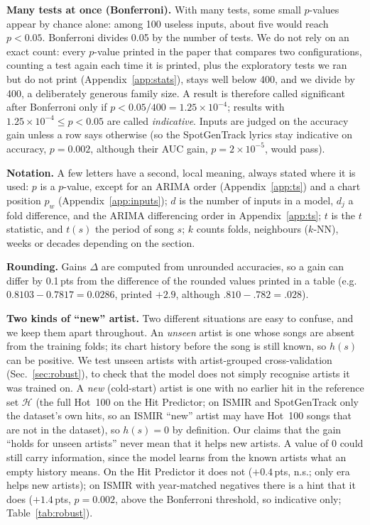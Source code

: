\documentclass[conference]{IEEEtran}
\newcommand{\pp}{\,pts}
\begin{document}
\textbf{Many tests at once (Bonferroni).} With many tests, some small $p$-values appear by chance alone: among 100
useless inputs, about five would reach $p<0.05$. Bonferroni divides 0.05 by the number of tests. We do not rely on
an exact count: every $p$-value printed in the paper that compares two configurations, counting a test again each time it is printed, plus the
exploratory tests we ran but do not print (Appendix~\ref{app:stats}), stays well below 400, and we
divide by 400, a deliberately generous family size. A result is therefore called significant after Bonferroni only if $p<0.05/400=1.25\times10^{-4}$;
results with $1.25\times10^{-4}\leq p<0.05$ are called \emph{indicative}. Inputs are judged on the accuracy
gain unless a row says otherwise (so the SpotGenTrack lyrics stay indicative on accuracy, $p=0.002$, although their
AUC gain, $p=2\times10^{-5}$, would pass).

\textbf{Notation.} A few letters have a second, local meaning, always stated where it is used: $p$ is a
$p$-value, except for an ARIMA order (Appendix~\ref{app:ts}) and a chart position $p_w$ (Appendix~\ref{app:inputs}); $d$
is the number of inputs in a model, $d_j$ a fold difference, and the ARIMA differencing order in Appendix~\ref{app:ts};
$t$ is the $t$ statistic, and $t(s)$ the period of song $s$; $k$ counts folds, neighbours ($k$-NN), weeks or
decades depending on the section.

\textbf{Rounding.} Gains $\Delta$ are computed from unrounded accuracies, so a gain can differ by 0.1\pp{} from the
difference of the rounded values printed in a table (e.g.\ $0.8103-0.7817=0.0286$, printed $+2.9$, although $.810-.782=.028$).

\textbf{Two kinds of ``new'' artist.} Two different situations are easy to confuse, and we keep
them apart throughout. An \emph{unseen} artist is one whose songs are absent from the training
folds; its chart history before the song is still known, so $h(s)$ can be positive. We test unseen
artists with artist-grouped cross-validation (Sec.~\ref{sec:robust}), to check that the model does
not simply recognise artists it was trained on. A \emph{new} (cold-start) artist is one with no
earlier hit in the reference set $\mathcal{H}$ (the full Hot~100 on the Hit Predictor; on ISMIR and SpotGenTrack only
the dataset's own hits, so an ISMIR ``new'' artist may have Hot~100 songs that are not in the dataset), so $h(s)=0$
by definition. Our claims that the gain ``holds for unseen artists'' never mean that it helps new artists. A value
of 0 could still carry information, since the model learns from the known artists what an empty history means. On
the Hit Predictor it does not ($+0.4$\pp, n.s.; only era helps new artists); on ISMIR with year-matched negatives
there is a hint that it does ($+1.4$\pp, $p=0.002$, above the Bonferroni threshold, so indicative only;
Table~\ref{tab:robust}).
\end{document}
